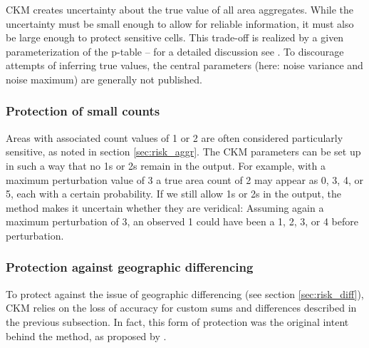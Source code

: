 CKM creates uncertainty about the true value of all area aggregates. While the uncertainty must be small enough to allow for reliable information, it must also be large enough to protect sensitive cells. This trade-off is realized by a given parameterization of the p-table -- for a detailed discussion see \cite[~ch.4]{Guidelines3_CensusDemog}. To discourage attempts of inferring true values, the central parameters (here: noise variance and noise maximum) are generally not published.

\subsubsection{Protection of small counts}

Areas with associated count values of 1 or 2 are often considered particularly sensitive, as noted in section \ref{sec:risk_aggr}. The CKM parameters can be set up in such a way that no 1s or 2s remain in the output. For example, with a maximum perturbation value of 3 a true area count of 2 may appear as 0, 3, 4, or 5, each with a certain probability. If we still allow 1s or 2s in the output, the method makes it uncertain whether they are veridical: Assuming again a maximum perturbation of 3, an observed 1 could have been a 1, 2, 3, or 4 before perturbation.

\subsubsection{Protection against geographic differencing}

To protect against the issue of geographic differencing (see section \ref{sec:risk_diff}), CKM relies on the loss of accuracy for custom sums and differences described in the previous subsection. In fact, this form of protection was the original intent behind the method, as proposed by \cite{FraserWooton2005}.

